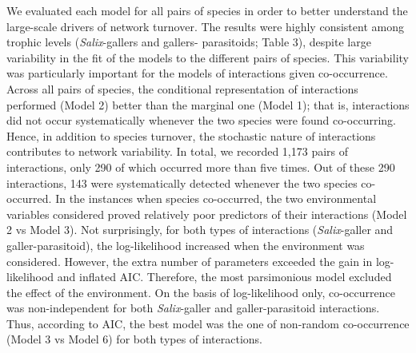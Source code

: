 \documentclass[12pt]{article}
\begin{document}
We evaluated each model for all pairs of species in order to better understand
the large-scale drivers of network turnover. The results were highly
consistent among trophic levels (\textit{Salix}-gallers and gallers-
parasitoids; Table 3), despite large variability in the fit of the models to
the different pairs of species. This variability was particularly important
for the models of interactions given co-occurrence. Across all pairs of
species, the conditional representation of interactions performed (Model 2)
better than the marginal one (Model 1); that is, interactions did not occur
systematically whenever the two species were found co-occurring. Hence, in
addition to species turnover, the stochastic nature of interactions
contributes to network variability. In total, we recorded 1,173 pairs of
interactions, only 290 of which occurred more than five times. Out of these
290 interactions, 143 were systematically detected whenever the two species
co-occurred. In the instances when species co-occurred, the two environmental
variables considered proved relatively poor predictors of their interactions
(Model 2 vs Model 3). Not surprisingly, for both types of interactions
(\textit{Salix}-galler and galler-parasitoid), the log-likelihood increased
when the environment was considered. However, the extra number of parameters
exceeded the gain in log-likelihood and inflated AIC. Therefore, the most
parsimonious model excluded the effect of the environment. On the basis of
log-likelihood only, co-occurrence was non-independent for both
\textit{Salix}-galler and galler-parasitoid interactions. Thus, according to
AIC, the best model was the one of non-random co-occurrence (Model 3 vs Model
6) for both types of interactions.

\end{document}
